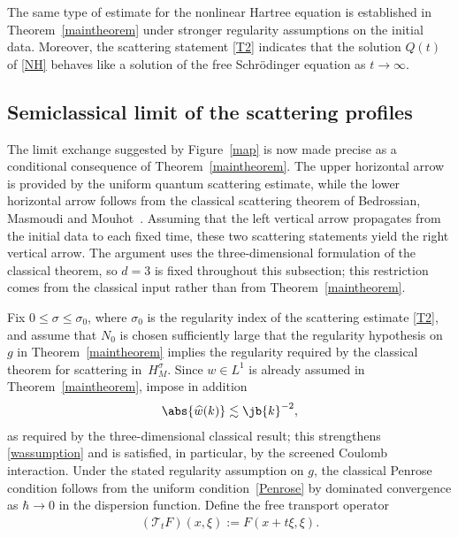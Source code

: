 The same type of estimate for the nonlinear Hartree equation is established in Theorem~\ref{maintheorem} under stronger regularity assumptions on the initial data. Moreover, the scattering statement \eqref{T2} indicates that the solution $Q(t)$ of \eqref{NH} behaves like a solution of the free Schrödinger equation as $t\rightarrow\infty$.

\subsection{Semiclassical limit of the scattering profiles}\label{semiclassicalscatteringsection}
The limit exchange suggested by Figure~\ref{map} is now made precise as a conditional consequence of Theorem~\ref{maintheorem}. The upper horizontal arrow is provided by the uniform quantum scattering estimate, while the lower horizontal arrow follows from the classical scattering theorem of Bedrossian, Masmoudi and Mouhot~\cite{BedrossianMasmoudiMouhot2018}. Assuming that the left vertical arrow propagates from the initial data to each fixed time, these two scattering statements yield the right vertical arrow. The argument uses the three-dimensional formulation of the classical theorem, so $d=3$ is fixed throughout this subsection; this restriction comes from the classical input rather than from Theorem~\ref{maintheorem}.

Fix $0\leq\sigma\leq\sigma_0$, where $\sigma_0$ is the regularity index of the scattering estimate \eqref{T2}, and assume that $N_0$ is chosen sufficiently large that the regularity hypothesis on $g$ in Theorem~\ref{maintheorem} implies the regularity required by the classical theorem for scattering in~$H^{\sigma}_M$. Since $w\in L^1$ is already assumed in Theorem~\ref{maintheorem}, impose in addition
\begin{align*}
\abs{\widehat w(k)}\lesssim\jb{k}^{-2},
\end{align*}
as required by the three-dimensional classical result; this strengthens \eqref{wassumption} and is satisfied, in particular, by the screened Coulomb interaction. Under the stated regularity assumption on $g$, the classical Penrose condition follows from the uniform condition~\eqref{Penrose} by dominated convergence as $\hbar\to0$ in the dispersion function. Define the free transport operator
\begin{align*}
(\mathcal T_tF)(x,\xi):=F(x+t\xi,\xi).
\end{align*}

